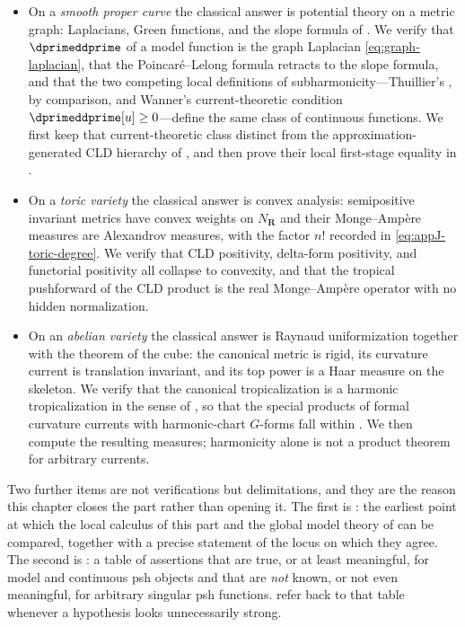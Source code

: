 \begin{itemize}
\item On a \emph{smooth proper curve} the classical answer is potential
theory on a metric graph: Laplacians, Green functions, and the slope formula
of .  We verify that
$\dprimeddprime$ of a model function is the graph Laplacian
\eqref{eq:graph-laplacian}, that the Poincar\'e--Lelong formula
 retracts to the slope formula, and that the
two competing local definitions of subharmonicity---Thuillier's
\cite[Def.~3.1.5]{Thu05}, by comparison, and Wanner's current-theoretic
condition $\dprimeddprime[u]\ge0$---define the same class of continuous
functions.  We first keep that current-theoretic class distinct from the
approximation-generated CLD hierarchy of , and then
prove their local first-stage equality in
.
\item On a \emph{toric variety} the classical answer is convex analysis:
semipositive invariant metrics have convex weights on $N_{\mathbf R}$ and their
Monge--Amp\`ere measures are Alexandrov measures, with the factor $n!$
recorded in \eqref{eq:appJ-toric-degree}.  We verify that CLD positivity,
delta-form positivity, and functorial positivity all collapse to convexity,
and that the tropical pushforward of the CLD product is the real
Monge--Amp\`ere operator with no hidden normalization.
\item On an \emph{abelian variety} the classical answer is Raynaud
uniformization together with the theorem of the cube: the canonical metric
is rigid, its curvature current is translation invariant, and its top power
is a Haar measure on the skeleton.  We verify that the canonical tropicalization
is a harmonic tropicalization in the sense of , so
that the special products of formal curvature currents with harmonic-chart
$G$-forms fall within .  We then compute
the resulting measures; harmonicity alone is not a product theorem for
arbitrary currents.
\end{itemize}

Two further items are not verifications but delimitations, and they are the
reason this chapter closes the part rather than opening it.  The first is
: the earliest point at which the local calculus of
this part and the global model theory of  can be compared,
together with a precise statement of the locus on which they agree.  The
second is : a table of assertions that are true,
or at least meaningful, for model and continuous psh objects and that are
\emph{not} known, or not even meaningful, for arbitrary singular psh
functions.   refer back to that table
whenever a hypothesis looks unnecessarily strong.


